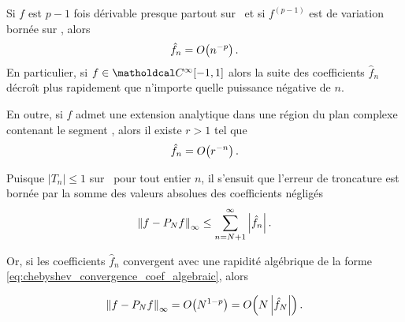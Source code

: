 \begin{theoreme}
	Si $f$ est $p-1$ fois dérivable presque partout sur \chebopeninterval\ et si $f^{(p-1)}$ est de variation bornée sur \chebinterval, alors 
	\begin{equation}
		\hat{f}_n = \bigO{n^{-p}}.
		\label{eq:chebyshev_convergence_coef_algebraic}
	\end{equation}
	En particulier, si $f \in \contdiff{\infty}\chebinterval$ alors 
la suite des coefficients $\hat{f}_n$ décroît plus rapidement que n'importe quelle puissance négative de $n$.\par
	En outre, si $f$ admet une extension analytique dans une région %
	du plan complexe contenant le segment \chebinterval , alors il existe $r > 1$ tel que
	\begin{equation}
		\hat{f}_n = \bigO{r^{-n}}.
		\label{eq:chebyshev_convergence_coef_geometric}
	\end{equation}
\end{theoreme}
\par
Puisque $\left|T_n \right| \leq 1$ sur \chebinterval\ pour tout entier $n$, il s'ensuit que l'erreur de troncature est bornée par la somme des valeurs absolues des coefficients négligés
\begin{equation}
	\norminf{f - \truncseries{f}{N}} \leq \sum_{n=N+1}^{\infty} 
	\left| \hat{f}_n \right|.
	\label{eq:chebyshev_truncation_error_bound}
\end{equation}

Or, si les coefficients $\hat{f}_n$ convergent avec une rapidité algébrique de la forme \eqref{eq:chebyshev_convergence_coef_algebraic}, alors\par
\begin{equation}
	\norminf{f - \truncseries{f}{N}} 
	= \bigO{N^{1-p}} 
	= \bigO{N \left| \hat{f}_N \right|}.
	\label{eq:chebyshev_truncation_error_estimator_algebraic}
\end{equation}

